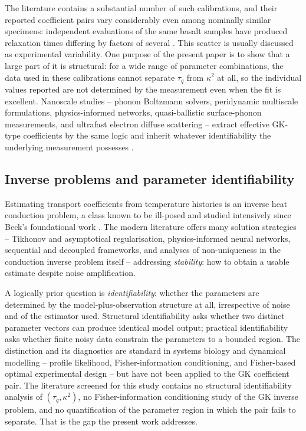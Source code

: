 \documentclass[preprint,12pt,a4paper]{elsarticle}
\theoremstyle{plain}
\theoremstyle{definition}
\theoremstyle{remark}
\newcommand{\tq}{\tau_{q}}
\newcommand{\kk}{\kappa^{2}}
\begin{document}
The literature contains a substantial number of such calibrations, and their
reported coefficient pairs vary considerably even among nominally similar
specimens: independent evaluations of the same basalt samples have produced
relaxation times differing by factors of several \cite{FeherKovacs2021}.
This scatter is usually discussed as experimental variability. One purpose
of the present paper is to show that a large part of it is structural: for a
wide range of parameter combinations, the data used in these calibrations
cannot separate $\tq$ from $\kk$ at all, so the individual values reported
are not determined by the measurement even when the fit is excellent.
Nanoscale studies -- phonon Boltzmann solvers, peridynamic multiscale
formulations, physics-informed networks, quasi-ballistic surface-phonon
measurements, and ultrafast electron diffuse scattering -- extract effective
GK-type coefficients by the same logic and inherit whatever identifiability
the underlying measurement possesses
\cite{Saurav2024,Zheng2024,Li2025,Kremeyer2024}.

\subsection{Inverse problems and parameter identifiability}

Estimating transport coefficients from temperature histories is an inverse
heat conduction problem, a class known to be ill-posed and studied
intensively since Beck's foundational work \cite{Najafi2024}. The modern
literature offers many solution strategies -- Tikhonov and asymptotical
regularisation, physics-informed neural networks, sequential and decoupled
frameworks, and analyses of non-uniqueness in the conduction inverse problem
itself \cite{Long2025,Shang2025,Borukhov2024} --
addressing \emph{stability}: how to obtain a usable estimate despite noise
amplification.

A logically prior question is \emph{identifiability}: whether the parameters
are determined by the model-plus-observation structure at all, irrespective
of noise and of the estimator used. Structural identifiability asks whether
two distinct parameter vectors can produce identical model output; practical
identifiability asks whether finite noisy data constrain the parameters to a
bounded region. The distinction and its diagnostics are standard in systems
biology and dynamical modelling -- profile likelihood, Fisher-information
conditioning, and Fisher-based optimal experimental design
\cite{Raue2009,Simpson2023,Borisov2026,Simpson2026,Binns2024,Liu2026,Jung2021,Stromberg2016,Neilsen2018,Wang2024}
-- but have not been applied to the GK coefficient pair. The literature
screened for this study contains no structural identifiability analysis of
$(\tq,\kk)$, no Fisher-information conditioning study of the GK inverse
problem, and no quantification of the parameter region in which the pair
fails to separate. That is the gap the present work addresses.
\end{document}
